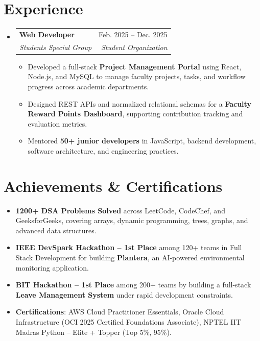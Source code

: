 \documentclass[letterpaper,10pt]{article}
\makeatletter
\newcommand{\resumeItem}[1]{
  \item\small{#1\vspace{-1pt}}
}
\newcommand{\resumeSubheading}[4]{
  \vspace{-1pt}\item
  \begin{tabular*}{0.97\textwidth}[t]{l@{\extracolsep{\fill}}r}
    \textbf{#1} & #2 \\
    \textit{\small#3} & \textit{\small#4} \\
  \end{tabular*}
  \vspace{-3pt}
}
\newcommand{\resumeSubHeadingListStart}{
\begin{itemize}[
    leftmargin=0.15in,
    label={},
    itemsep=1.5pt,
    parsep=0pt,
    topsep=1.5pt,
    partopsep=0pt
]
}
\newcommand{\resumeSubHeadingListEnd}{
\end{itemize}
\vspace{-3pt}
}
\newcommand{\resumeItemListStart}{
\begin{itemize}[
    itemsep=0.6pt,
    parsep=0pt,
    topsep=1pt,
    partopsep=0pt,
    leftmargin=0.18in
]
}
\newcommand{\resumeItemListEnd}{
\end{itemize}
\vspace{-2pt}
}
\makeatother
\begin{document}
\section{Experience}

\resumeSubHeadingListStart

\resumeSubheading
{Web Developer}{Feb. 2025 -- Dec. 2025}
{Students Special Group}{Student Organization}

\resumeItemListStart

    \resumeItem{Developed a full-stack \textbf{Project Management Portal} using React, Node.js, and MySQL to manage faculty projects, tasks, and workflow progress across academic departments.}

    \resumeItem{Designed REST APIs and normalized relational schemas for a \textbf{Faculty Reward Points Dashboard}, supporting contribution tracking and evaluation metrics.}

    \resumeItem{Mentored \textbf{50+ junior developers} in JavaScript, backend development, software architecture, and engineering practices.}

\resumeItemListEnd

\resumeSubHeadingListEnd

\section{Achievements \& Certifications}

\resumeItemListStart

    \resumeItem{\textbf{1200+ DSA Problems Solved} across LeetCode, CodeChef, and GeeksforGeeks, covering arrays, dynamic programming, trees, graphs, and advanced data structures.}

    \resumeItem{\textbf{IEEE DevSpark Hackathon -- 1st Place} among 120+ teams in Full Stack Development for building \textbf{Plantera}, an AI-powered environmental monitoring application.}

    \resumeItem{\textbf{BIT Hackathon -- 1st Place} among 200+ teams by building a full-stack \textbf{Leave Management System} under rapid development constraints.}

    \resumeItem{\textbf{Certifications}: AWS Cloud Practitioner Essentials, Oracle Cloud Infrastructure (OCI 2025 Certified Foundations Associate), NPTEL IIT Madras Python -- Elite + Topper (Top 5\%, 95\%).}

\resumeItemListEnd
\end{document}
